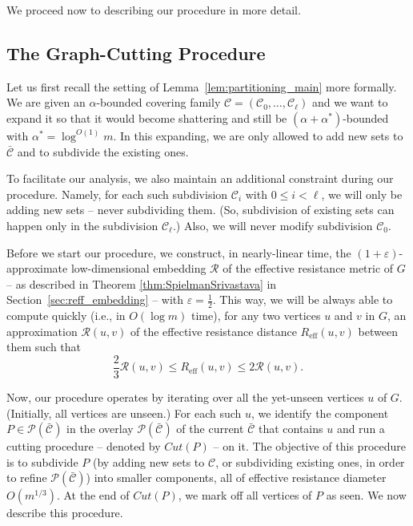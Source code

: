 \documentclass[11pt, letterpaper]{article}
\newcommand{\cC}{\mathcal{C}}
\newcommand{\ocC}{\bar{\mathcal{C}}}
\newcommand{\cP}{\mathcal{P}}
\newcommand{\Reff}{R_{\mathrm{eff}}}
\newcommand{\cR}{\mathcal{R}}
\begin{document}
We proceed now to describing our procedure in more detail.

\subsection{The Graph-Cutting Procedure}

Let us first recall the setting of Lemma~\ref{lem:partitioning_main} more formally. We are given an $\alpha$-bounded covering family $\cC = (\cC_0,\dots,\cC_\ell)$ and we want to expand it so that it would become shattering and still be $(\alpha + \alpha^*)$-bounded with $\alpha^* = \log^{O(1)}m$. In this expanding, we are only allowed to add new sets to $\ocC$ and to subdivide the existing ones.

To facilitate our analysis, we also maintain an additional constraint during our procedure. Namely, for each such subdivision $\cC_i$ with $0\leq i<\ell$, we will only be adding new sets -- never subdividing them. (So, subdivision of existing sets can happen only in the subdivision $\cC_\ell$.) Also, we will never modify subdivision $\cC_0$.

Before we start our procedure, we construct, in nearly-linear time, the $(1+\varepsilon)$-approximate low-dimensional embedding $\cR$ of the effective resistance metric of $G$ -- as described in Theorem \ref{thm:SpielmanSrivastava} in Section~\ref{sec:reff_embedding} -- with $\varepsilon=\frac{1}{2}$. This way, we will be always able to compute quickly (i.e., in $O(\log m)$ time), for any two vertices $u$ and $v$ in $G$, an approximation $\cR(u,v)$ of the effective resistance distance $\Reff(u,v)$ between them such that
\begin{equation} \label{eq:embedding_bound}
\frac 23 \cR(u,v) \le \Reff(u,v) \le 2 \cR(u,v).
\end{equation}



Now, our procedure operates by iterating over all the yet-unseen vertices $u$ of $G$. (Initially, all vertices are unseen.) For each such $u$, we identify the component $P \in \cP(\ocC)$ in the overlay $\cP(\ocC)$ of the current $\ocC$ that contains $u$ and run a cutting procedure -- denoted by $Cut(P)$ -- on it. The objective of this procedure is to subdivide $P$ (by adding new sets to $\cC$, or subdividing existing ones, in order to refine $\cP(\ocC)$) into smaller components, all of effective resistance diameter $O(m^{1/3})$. At the end of $Cut(P)$, we mark off all vertices of $P$ as seen. We now describe this procedure.
\end{document}
